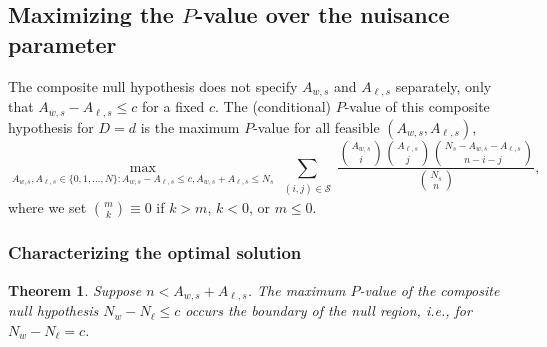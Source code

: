 \documentclass[runningheads]{llncs}
\newtheorem{thm}{Theorem}
\begin{document}
\subsection{Maximizing the $P$-value over the nuisance parameter}

The composite null hypothesis does not specify $A_{w,s}$ and $A_{\ell,s}$ separately, only 
that $A_{w,s} - A_{\ell,s} \le c$ for a fixed $c$.
The (conditional) $P$-value of this composite hypothesis for $D=d$ is the maximum $P$-value for all
feasible $(A_{w,s}, A_{\ell,s})$,
\begin{equation}
  \max_{A_{w,s}, A_{\ell,s} \in \{0, 1, \ldots, N \}: A_{w,s} - A_{\ell,s} \le c, A_{w,s} + A_{\ell,s} \le N_s}
   \sum_{\substack{(i, j)\in \mathcal{S}}} \frac{ {A_{w,s } \choose i}{A_{\ell,s} \choose j}{N_s - A_{w,s} - A_{\ell,s} \choose n-i-j}}{{N_s \choose n}},
\end{equation}
where we set ${m \choose k} \equiv 0$ if $k > m$, $k < 0$, or $m \le 0$.

\subsubsection{Characterizing the optimal solution}

\begin{thm}
Suppose $n < A_{w,s}+A_{\ell,s}$.
The maximum $P$-value of the composite null hypothesis $N_w - N_\ell \leq c$
occurs the boundary of the null region, i.e., for $N_w - N_\ell = c$.
\end{thm}
\end{document}
